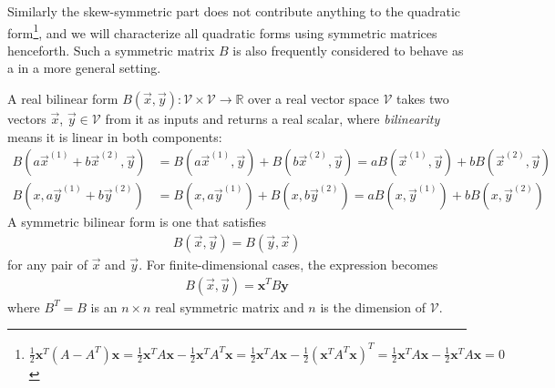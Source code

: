 Similarly the skew-symmetric part does not contribute anything to the quadratic form\footnote{$\frac{1}{2}\textbf{x}^T(A - A^T)\textbf{x} = \frac{1}{2}\textbf{x}^TA\textbf{x} - \frac{1}{2}\textbf{x}^TA^T\textbf{x} = \frac{1}{2}\textbf{x}^TA\textbf{x} - \frac{1}{2}(\textbf{x}^TA^T\textbf{x})^T = \frac{1}{2}\textbf{x}^TA\textbf{x} - \frac{1}{2}\textbf{x}^TA\textbf{x} = 0$}, and we will characterize all quadratic forms using symmetric matrices henceforth.
Such a symmetric matrix $B$ is also frequently considered to behave as a  in a more general setting.
\begin{defn}
A real bilinear form $B(\vec{x}, \vec{y}): \mathcal{V} \times \mathcal{V} \to \mathbb{R}$ over a real vector space $\mathcal{V}$ takes two vectors $\vec{x}$, $\vec{y} \in \mathcal{V}$ from it as inputs and returns a real scalar, where \textit{bilinearity} means it is linear in both components:
\begin{subequations}
\begin{align}
B(a\vec{x}^{(1)}+b\vec{x}^{(2)},\vec{y}) &= B(a\vec{x}^{(1)},\vec{y}) + B(b\vec{x}^{(2)},\vec{y}) = aB(\vec{x}^{(1)},\vec{y}) + bB(\vec{x}^{(2)},\vec{y}) \\
B(x,a\vec{y}^{(1)}+b\vec{y}^{(2)}) &= B(x,a\vec{y}^{(1)}) + B(x,b\vec{y}^{(2)}) = aB(x,\vec{y}^{(1)}) + bB(x,\vec{y}^{(2)}) 
\end{align}
\end{subequations}
A symmetric bilinear form is one that satisfies 
\begin{align}
B(\vec{x}, \vec{y}) = B(\vec{y}, \vec{x})    
\end{align}
for any pair of $\vec{x}$ and $\vec{y}$. For finite-dimensional cases, the expression becomes
\begin{align}
B(\vec{x}, \vec{y}) = \textbf{x}^T B \textbf{y}    
\end{align}
where $B^T = B$ is an $n \times n$ real symmetric matrix and $n$ is the dimension of $\mathcal{V}$.
\end{defn}
